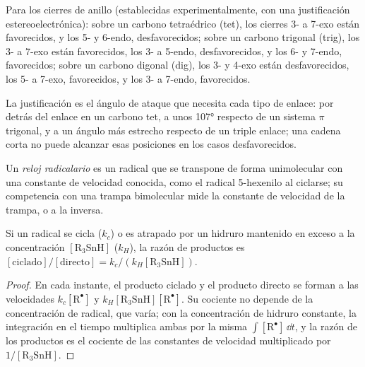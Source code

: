 \begin{proposition}\label{prop:b3:radicals-carbenes:baldwin}
Para los cierres de anillo (establecidas experimentalmente, con una justificación
estereoelectrónica): sobre un carbono tetraédrico (tet), los cierres 3- a 7-exo están favorecidos, y los 5- y
6-endo, desfavorecidos; sobre un carbono trigonal (trig), los 3- a 7-exo están favorecidos, los 3- a 5-endo,
desfavorecidos, y los 6- y 7-endo, favorecidos; sobre un carbono digonal (dig), los 3- y 4-exo están
desfavorecidos, los 5- a 7-exo, favorecidos, y los 3- a 7-endo, favorecidos.
\end{proposition}

La justificación es el ángulo de ataque que necesita cada tipo de enlace: por detrás del
enlace en un carbono tet, a unos 107° respecto de un sistema $\pi$ trigonal, y a un ángulo más
estrecho respecto de un triple enlace; una cadena corta no puede alcanzar esas posiciones en los
casos desfavorecidos.

\begin{definition}\label{def:b3:radicals-carbenes:radical-clock}
Un \emph{reloj radicalario} es un radical que se transpone
de forma unimolecular con una constante de velocidad conocida, como el radical 5-hexenilo
al ciclarse; su competencia con una trampa bimolecular mide la constante de velocidad
de la trampa, o a la inversa.
\end{definition}

\begin{proposition}\label{prop:b3:radicals-carbenes:clock}
Si un radical se cicla ($k_c$) o es atrapado por un hidruro mantenido en exceso a la
concentración $[\mathrm{R_3SnH}]$ ($k_H$), la razón de productos es
$[\text{ciclado}]/[\text{directo}] = k_c/(k_H[\mathrm{R_3SnH}])$.
\end{proposition}

\begin{proof}
En cada instante, el producto ciclado y el producto directo se forman a las velocidades $k_c[\mathrm R^\bullet]$ y $k_H[\mathrm{R_3SnH}][\mathrm R^\bullet]$. Su cociente
no depende de la concentración de radical, que varía; con la concentración de hidruro
constante, la integración en el tiempo multiplica ambas por la misma
$\int[\mathrm R^\bullet]\,\dd t$, y la razón de los productos es el cociente de las constantes de velocidad
multiplicado por $1/[\mathrm{R_3SnH}]$.
\end{proof}


